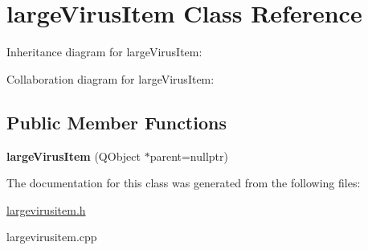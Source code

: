\hypertarget{classlargeVirusItem}{}\section{large\+Virus\+Item Class Reference}
\label{classlargeVirusItem}


Inheritance diagram for large\+Virus\+Item\+:


Collaboration diagram for large\+Virus\+Item\+:
\subsection*{Public Member Functions}
\begin{DoxyCompactItemize}
\item 
\mbox{\label{classlargeVirusItem_aa090fc354e3827883ce982e7c600ea2f}} 
{\bfseries large\+Virus\+Item} (Q\+Object $\ast$parent=nullptr)
\end{DoxyCompactItemize}


The documentation for this class was generated from the following files\+:\begin{DoxyCompactItemize}
\item 
\hyperlink{largevirusitem_8h}{largevirusitem.\+h}\item 
largevirusitem.\+cpp\end{DoxyCompactItemize}
